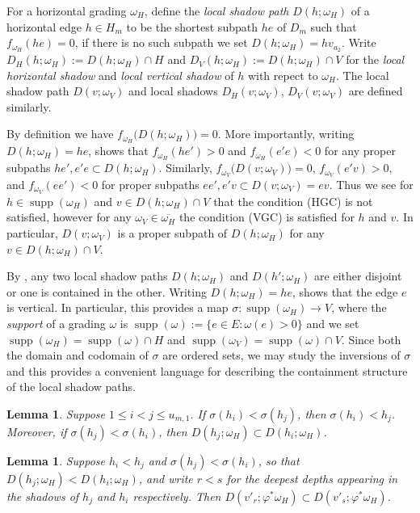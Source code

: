 \documentclass{amsart}
\newtheorem{lemma}[theorem]{Lemma}
\newcommand{\supp}{\operatorname{supp}}
\begin{document}
For a horizontal grading $\omega_H$, define the \emph{local shadow path} $D(h;\omega_H)$ of a horizontal edge $h\in H_m$ to be the shortest subpath $he$ of $D_m$ such that $f_{\omega_H}(he)=0$, if there is no such subpath we set $D(h;\omega_H)=hv_{a_2}$.  Write $D_H(h;\omega_H):=D(h;\omega_H)\cap H$ and $D_V(h;\omega_H):=D(h;\omega_H)\cap V$ for the \emph{local horizontal shadow} and \emph{local vertical shadow} of $h$ with repect to $\omega_H$.  The local shadow path $D(v;\omega_V)$ and local shadows $D_H(v;\omega_V)$, $D_V(v;\omega_V)$ are defined similarly.

By definition we have $f_{\omega_H}\big(D(h;\omega_H)\big)=0$.  More importantly, writing $D(h;\omega_H)=he$, \cite[Lemma~4.8]{rupel2} shows that $f_{\omega_H}(he')>0$ and $f_{\omega_H}(e'e)<0$ for any proper subpaths $he',e'e\subset D(h;\omega_H)$.  Similarly, $f_{\omega_V}\big(D(v;\omega_V)\big)=0$, $f_{\omega_V}(e'v)>0$, and $f_{\omega_V}(ee')<0$ for proper subpaths $ee',e'v\subset D(v;\omega_V)=ev$.  Thus we see for $h\in\supp(\omega_H)$ and $v\in D(h;\omega_H)\cap V$ that the condition (HGC) is not satisfied, however for any $\omega_V\in\overline{\omega_H}$ the condition (VGC) is satisfied for $h$ and $v$.  In particular, $D(v;\omega_V)$ is a proper subpath of $D(h;\omega_H)$ for any $v\in D(h;\omega_H)\cap V$.

By \cite[Lemma~4.10]{rupel2}, any two local shadow paths $D(h;\omega_H)$ and $D(h';\omega_H)$ are either disjoint or one is contained in the other.  Writing $D(h;\omega_H)=he$, \cite[Lemma~4.8]{rupel2} shows that the edge $e$ is vertical.  In particular, this provides a map $\sigma:\supp(\omega_H)\to V$, where the \emph{support} of a grading $\omega$ is $\supp(\omega):=\{e\in E:\omega(e)>0\}$ and we set $\supp(\omega_H)=\supp(\omega)\cap H$ and $\supp(\omega_V)=\supp(\omega)\cap V$.  Since both the domain and codomain of $\sigma$ are ordered sets, we may study the inversions of $\sigma$ and this provides a convenient language for describing the containment structure of the local shadow paths.
\begin{lemma}\label{le:shadow path containment}
  Suppose $1\le i<j\le u_{m,1}$.  If $\sigma(h_i)<\sigma(h_j)$, then $\sigma(h_i)<h_j$.  Moreover, if $\sigma(h_j)<\sigma(h_i)$, then $D(h_j;\omega_H)\subset D(h_i;\omega_H)$.
\end{lemma}
\begin{lemma}
  Suppose $h_i<h_j$ and $\sigma(h_j)<\sigma(h_i)$, so that $D(h_j;\omega_H)<D(h_i;\omega_H)$, and write $r<s$ for the deepest depths appearing in the shadows of $h_j$ and $h_i$ respectively.  Then $D(v'_r;\varphi^*\omega_H)\subset D(v'_s;\varphi^*\omega_H)$.
\end{lemma}
\end{document}
